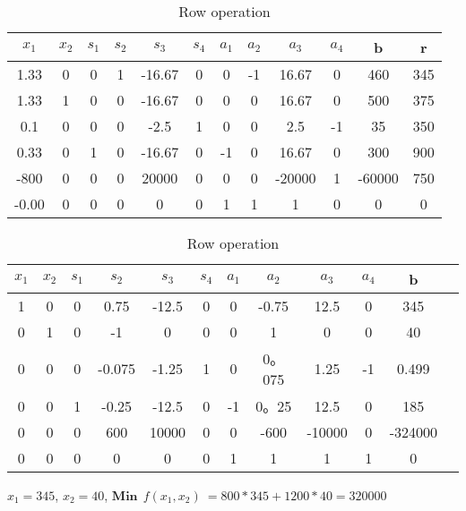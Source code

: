 \documentclass{article}
\begin{document}
  \begin{table}[H]
  \centering
  \caption{Row operation}
  \label{my-label}
  \begin{tabular}{|c|c|c|c|c|c|c|c|c|c|c|c|}
  \hline
  $x_1$ & $x_2$ & $s_1$  & $s_2$ & $s_3$ & $s_4$ & $a_1$ & $a_2$ & $a_3$ & $a_4$ & b & r  \\ \hline
  1.33    & 0      & 0       & 1       & -16.67  & 0    & 0        & -1    & 16.67   & 0  & 460  & 345\\ \hline
  1.33    & 1      & 0       & 0       & -16.67  & 0    & 0        & 0     & 16.67   & 0  & 500  & 375\\ \hline
  0.1     & 0      & 0       & 0       & -2.5    & 1    & 0        & 0     & 2.5     & -1 & 35   & 350\\ \hline
  0.33    & 0      & 1       & 0       & -16.67  & 0    & -1       & 0     & 16.67   & 0  & 300  & 900\\ \hline
  -800    & 0      & 0       & 0       & 20000   & 0    & 0        & 0     & -20000  & 1  & -60000 & 750\\ \hline
  -0.00   & 0      & 0       & 0       & 0       & 0    & 1        & 1     & 1       & 0  & 0     & 0 \\ \hline
  \end{tabular}
  \end{table}

  \begin{table}[H]
  \centering
  \caption{Row operation}
  \label{my-label}
  \begin{tabular}{|c|c|c|c|c|c|c|c|c|c|c|c|}
  \hline
  $x_1$ & $x_2$ & $s_1$  & $s_2$ & $s_3$ & $s_4$ & $a_1$ & $a_2$ & $a_3$ & $a_4$ & b \\ \hline
  1   & 0      & 0       & 0.75    & -12.5  & 0    & 0        & -0.75  & 12.5   & 0  & 345  \\ \hline
  0   & 1      & 0       & -1      & 0      & 0    & 0        & 1      & 0      & 0  & 40   \\ \hline
  0   & 0      & 0       & -0.075  & -1.25  & 1    & 0        & 0。075 & 1.25   & -1 & 0.499   \\ \hline
  0   & 0      & 1       & -0.25   & -12.5  & 0    & -1       & 0。25  & 12.5   & 0  & 185  \\ \hline
  0   & 0      & 0       & 600     & 10000  & 0    & 0        & -600   & -10000 & 0  & -324000 \\ \hline
  0   & 0      & 0       & 0       & 0      & 0    & 1        & 1      & 1      & 1  & 0     \\ \hline
  \end{tabular}
  \end{table}

  $x_1=345$, $x_2=40$, $\textbf{Min}\:\: f(x_1,x_2) \: = 800*345 + 1200*40 = 320000$
\end{document}
